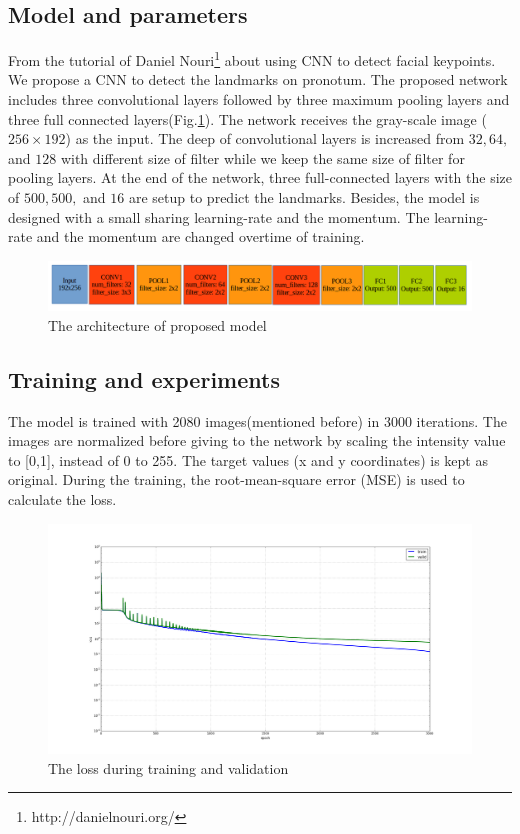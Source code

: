 \subsection{Model and parameters}
From the tutorial of Daniel Nouri\footnote{http://danielnouri.org/} about using CNN to detect facial keypoints. We propose a CNN to detect the landmarks on pronotum. The proposed network includes three convolutional layers followed by three maximum pooling layers and three full connected layers(Fig.\ref{pmodel}). The network receives the gray-scale image ($256 \times 192$) as the input. The deep of convolutional layers is increased from $32, 64, $ and $ 128$ with different size of filter while we keep the same size of filter for pooling layers. At the end of the network, three full-connected layers with the size of $500, 500, $ and $16$ are setup to predict the landmarks. Besides, the model is designed with a small sharing learning-rate and the momentum. The learning-rate and the momentum are changed overtime of training.
\begin{figure}[h!]
	\centering
	\includegraphics[scale=0.4]{images/proposed_model}
	\caption{The architecture of proposed model}
	\label{pmodel}
\end{figure}
\subsection{Training and experiments}
The model is trained with 2080 images(mentioned before) in 3000 iterations. The images are normalized before giving to the network by scaling the intensity value to [0,1], instead of 0 to 255. The target values (x and y coordinates) is kept as original. During the training, the root-mean-square error (MSE) is used to calculate the loss.
\begin{figure}[h!]
	\centering
	\includegraphics[scale=0.25]{images/figure_1_loss_cnn3_3000_2}
	\caption{The loss during training and validation}
	\label{cnn3l}
\end{figure}

